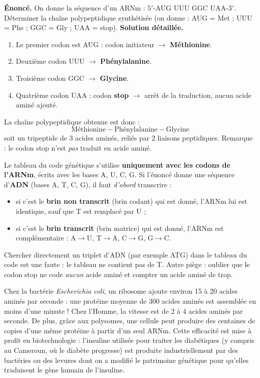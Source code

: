 \documentclass[11pt]{article}
\begin{document}
\begin{exoresolu}
\textbf{Énoncé.} On donne la séquence d'un ARNm : $5'$-AUG UUU GGC UAA-$3'$. Déterminer la chaîne polypeptidique synthétisée (on donne : AUG = Met ; UUU = Phe ; GGC = Gly ; UAA = stop).
\tcblower
\textbf{Solution détaillée.}
\begin{enumerate}
\item Le premier codon est AUG : codon initiateur $\rightarrow$ \textbf{Méthionine}.
\item Deuxième codon UUU $\rightarrow$ \textbf{Phénylalanine}.
\item Troisième codon GGC $\rightarrow$ \textbf{Glycine}.
\item Quatrième codon UAA : codon \textbf{stop} $\rightarrow$ arrêt de la traduction, aucun acide aminé ajouté.
\end{enumerate}
La chaîne polypeptidique obtenue est donc :
\[ \text{Méthionine} - \text{Phénylalanine} - \text{Glycine} \]
soit un tripeptide de 3 acides aminés, reliés par 2 liaisons peptidiques. Remarque : le codon stop n'est \emph{pas} traduit en acide aminé.
\end{exoresolu}

\begin{attention}
Le tableau du code génétique s'utilise \textbf{uniquement avec les codons de l'ARNm}, écrits avec les bases A, U, C, G. Si l'énoncé donne une séquence d'\textbf{ADN} (bases A, T, C, G), il faut \emph{d'abord} transcrire :
\begin{itemize}
\item si c'est le \textbf{brin non transcrit} (brin codant) qui est donné, l'ARNm lui est identique, sauf que T est remplacé par U ;
\item si c'est le \textbf{brin transcrit} (brin matrice) qui est donné, l'ARNm est complémentaire : A$\rightarrow$U, T$\rightarrow$A, C$\rightarrow$G, G$\rightarrow$C.
\end{itemize}
Chercher directement un triplet d'ADN (par exemple ATG) dans le tableau du code est une faute : le tableau ne contient pas de T. Autre piège : oublier que le codon stop ne code \emph{aucun} acide aminé et compter un acide aminé de trop.
\end{attention}

\begin{savaistu}
Chez la bactérie \emph{Escherichia coli}, un ribosome ajoute environ 15 à 20 acides aminés par seconde : une protéine moyenne de 300 acides aminés est assemblée en moins d'une minute ! Chez l'Homme, la vitesse est de 2 à 4 acides aminés par seconde. De plus, grâce aux polysomes, une cellule peut produire des centaines de copies d'une même protéine à partir d'un seul ARNm. Cette efficacité est mise à profit en biotechnologie : l'insuline utilisée pour traiter les diabétiques (y compris au Cameroun, où le diabète progresse) est produite industriellement par des bactéries ou des levures dont on a modifié le patrimoine génétique pour qu'elles traduisent le gène humain de l'insuline.
\end{savaistu}
\end{document}
